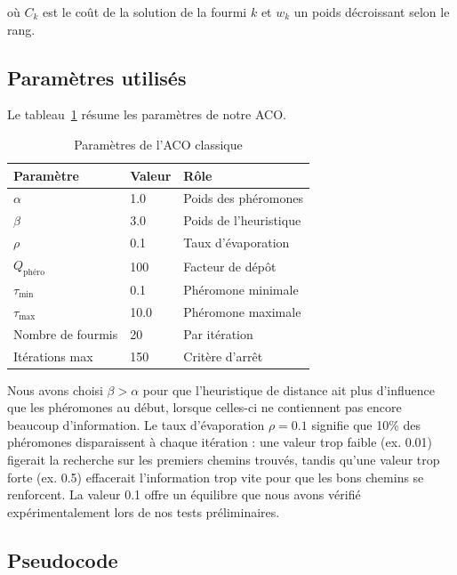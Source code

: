 \documentclass[12pt, a4paper]{article}
\begin{document}
où $C_k$ est le coût de la solution de la fourmi $k$ et $w_k$ un poids décroissant selon le rang.

\subsection{Paramètres utilisés}

Le tableau~\ref{tab:params_aco} résume les paramètres de notre ACO.

\begin{table}[H]
\centering
\caption{Paramètres de l'ACO classique}
\label{tab:params_aco}
\begin{tabular}{lll}
\toprule
\textbf{Paramètre} & \textbf{Valeur} & \textbf{Rôle} \\
\midrule
$\alpha$ & 1.0 & Poids des phéromones \\
$\beta$ & 3.0 & Poids de l'heuristique \\
$\rho$ & 0.1 & Taux d'évaporation \\
$Q_{\text{phéro}}$ & 100 & Facteur de dépôt \\
$\tau_{\min}$ & 0.1 & Phéromone minimale \\
$\tau_{\max}$ & 10.0 & Phéromone maximale \\
Nombre de fourmis & 20 & Par itération \\
Itérations max & 150 & Critère d'arrêt \\
\bottomrule
\end{tabular}
\end{table}

Nous avons choisi $\beta > \alpha$ pour que l'heuristique de distance ait plus d'influence que les phéromones au début, lorsque celles-ci ne contiennent pas encore beaucoup d'information. Le taux d'évaporation $\rho = 0.1$ signifie que 10\% des phéromones disparaissent à chaque itération : une valeur trop faible (ex. 0.01) figerait la recherche sur les premiers chemins trouvés, tandis qu'une valeur trop forte (ex. 0.5) effacerait l'information trop vite pour que les bons chemins se renforcent. La valeur 0.1 offre un équilibre que nous avons vérifié expérimentalement lors de nos tests préliminaires.

\subsection{Pseudocode}
\end{document}
